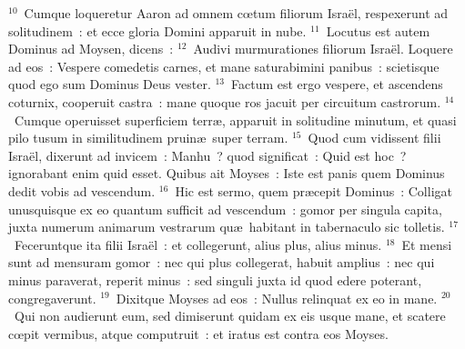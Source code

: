 ${}^{10}$~Cumque loqueretur Aaron ad omnem cœtum filiorum Isra\"el, respexerunt ad solitudinem~: et ecce gloria Domini apparuit in nube.
${}^{11}$~Locutus est autem Dominus ad Moysen, dicens~:
${}^{12}$~Audivi murmurationes filiorum Isra\"el. Loquere ad eos~: Vespere comedetis carnes, et mane saturabimini panibus~: scietisque quod ego sum Dominus Deus vester.
${}^{13}$~Factum est ergo vespere, et ascendens coturnix, cooperuit castra~: mane quoque ros jacuit per circuitum castrorum.
${}^{14}$~Cumque operuisset superficiem terr\ae , apparuit in solitudine minutum, et quasi pilo tusum in similitudinem pruin\ae\ super terram.
${}^{15}$~Quod cum vidissent filii Isra\"el, dixerunt ad invicem~: Manhu~? quod significat~: Quid est hoc~? ignorabant enim quid esset. Quibus ait Moyses~: Iste est panis quem Dominus dedit vobis ad vescendum.
${}^{16}$~Hic est sermo, quem pr\ae cepit Dominus~: Colligat unusquisque ex eo quantum sufficit ad vescendum~: gomor per singula capita, juxta numerum animarum vestrarum qu\ae\ habitant in tabernaculo sic tolletis.
${}^{17}$~Feceruntque ita filii Isra\"el~: et collegerunt, alius plus, alius minus.
${}^{18}$~Et mensi sunt ad mensuram gomor~: nec qui plus collegerat, habuit amplius~: nec qui minus paraverat, reperit minus~: sed singuli juxta id quod edere poterant, congregaverunt.
${}^{19}$~Dixitque Moyses ad eos~: Nullus relinquat ex eo in mane.
${}^{20}$~Qui non audierunt eum, sed dimiserunt quidam ex eis usque mane, et scatere cœpit vermibus, atque computruit~: et iratus est contra eos Moyses.


